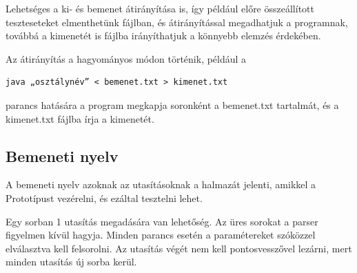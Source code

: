 Lehetséges a ki- és bemenet átirányítása is, így például előre összeállított teszteseteket elmenthetünk fájlban, és átirányítással megadhatjuk a programnak, továbbá a kimenetét is fájlba irányíthatjuk a könnyebb elemzés érdekében. 

Az átirányítás a hagyományos módon történik, például a 
\begin{verbatim}
java „osztálynév” < bemenet.txt > kimenet.txt
\end{verbatim}
parancs hatására a program megkapja soronként a bemenet.txt tartalmát, és a kimenet.txt fájlba írja a kimenetét.

\subsection{Bemeneti nyelv}
A bemeneti nyelv azoknak az utasításoknak a halmazát jelenti, amikkel a Prototípust vezérelni, és ezáltal tesztelni lehet.

Egy sorban 1 utasítás megadására van lehetőség. Az üres sorokat a parser figyelmen kívül hagyja. Minden parancs esetén a paramétereket szóközzel elválasztva kell felsorolni. Az utasítás végét nem kell pontosvesszővel lezárni, mert minden utasítás új sorba kerül.

